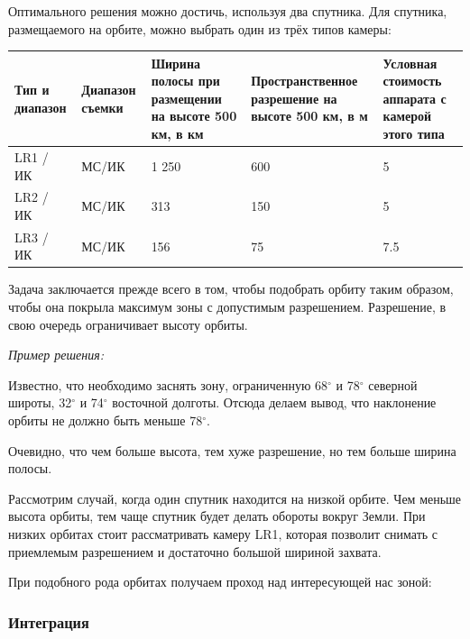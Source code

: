 Оптимального решения можно достичь, используя два спутника. Для спутника, размещаемого на орбите, можно выбрать один из трёх типов камеры:

\begin{table}[H]
    \center
    \begin{tabular}{|p{2cm}|p{1.5cm}|p{3.5cm}|p{3.5cm}|p{3.5cm}|}
        \hline
        Тип и диапазон	&Диапазон съемки	&Ширина полосы при размещении на высоте 500 км, в км	&Пространственное разрешение на высоте 500 км, в м	&Условная стоимость аппарата с камерой этого типа  \\
        \hline
        LR1 / ИК	&МС/ИК	&1 250	&600	&5 \\
        \hline
        LR2 / ИК	&МС/ИК	&313	&150	&5 \\
        \hline
        LR3 / ИК	&МС/ИК	&156	&75	&7.5 \\
        \hline
    \end{tabular}
\end{table}

Задача заключается прежде всего в том, чтобы подобрать орбиту таким образом, чтобы она покрыла максимум зоны с допустимым разрешением. Разрешение, в свою очередь ограничивает высоту орбиты.

\textit{Пример решения:}

Известно, что необходимо заснять зону, ограниченную 68$^\circ$ и 78$^\circ$ северной широты, 32$^\circ$ и 74$^\circ$ восточной долготы. Отсюда делаем вывод, что наклонение орбиты не должно быть меньше 78$^\circ$.

Очевидно, что чем больше высота, тем хуже разрешение, но тем больше ширина полосы. 

Рассмотрим случай, когда один спутник находится на низкой орбите. Чем меньше высота орбиты, тем чаще спутник будет делать обороты вокруг Земли. При низких орбитах стоит рассматривать камеру LR1, которая позволит снимать с приемлемым разрешением и достаточно большой шириной захвата.



При подобного рода орбитах получаем проход над интересующей нас зоной:



\subsubsection*{Интеграция}

